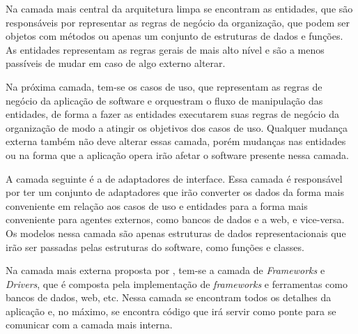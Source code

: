 \documentclass[12pt, %
openright, 
oneside, %
a4paper,    %
brazil]{facom-ufu-abntex2}
\begin{document}
Na camada mais central da arquitetura limpa se encontram as entidades, que são responsáveis por representar as regras de negócio da organização, que podem ser objetos com métodos ou apenas um conjunto de estruturas de dados e funções. As entidades representam as regras gerais de mais alto nível e são a menos passíveis de mudar em caso de algo externo alterar.

Na próxima camada, tem-se os casos de uso, que representam as regras de negócio da aplicação de software e orquestram o fluxo de manipulação das entidades, de forma a fazer as entidades executarem suas regras de negócio da organização de modo a atingir os objetivos dos casos de uso. Qualquer mudança externa também não deve alterar essas camada, porém mudanças nas entidades ou na forma que a aplicação opera irão afetar o software presente nessa camada.

A camada seguinte é a de adaptadores de interface. Essa camada é responsável por ter um conjunto de adaptadores que irão converter os dados da forma mais conveniente em relação aos casos de uso e entidades para a forma mais conveniente para agentes externos, como bancos de dados e a web, e vice-versa. Os modelos nessa camada são apenas estruturas de dados representacionais que irão ser passadas pelas estruturas do software, como funções e classes.

Na camada mais externa proposta por , tem-se a camada de \textit{Frameworks} e \textit{Drivers}, que é composta pela implementação de \textit{frameworks} e ferramentas como bancos de dados, web, etc. Nessa camada se encontram todos os detalhes da aplicação e, no máximo, se encontra código que irá servir como ponte para se comunicar com a camada mais interna.
\end{document}
